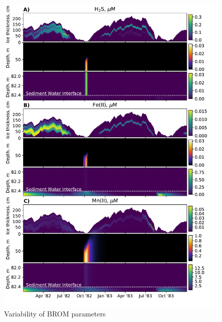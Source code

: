 \documentclass[gmd, manuscript]{copernicus}
\begin{document}
\begin{figure}[htbp]
\includegraphics[width=13.6cm]{fig05_3}
\caption{Variability of \textrm{BROM} parameters}
\label{fig:brom3}
\end{figure}
\end{document}

